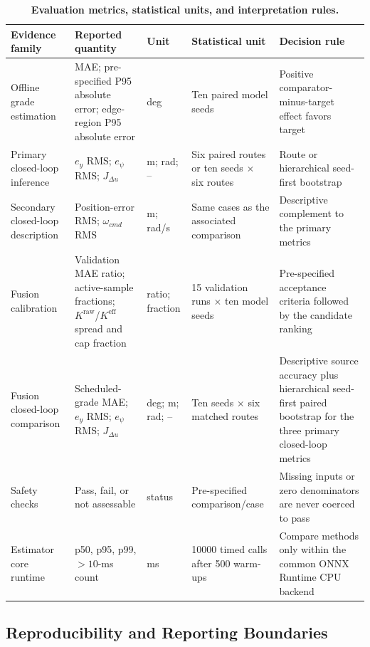 \documentclass{ieeeaccess}
\begin{document}
\begin{table}[!t]
\centering
\caption{\textbf{Evaluation metrics, statistical units, and interpretation rules.}}
\label{tab:evaluation_protocol}
\scriptsize
\setlength{\tabcolsep}{3.0pt}
\setlength{\tabcolsep}{3pt}
\begin{tabular}{|p{}|p{}|p{}|p{}|p{}|}
\hline
Evidence family & Reported quantity & Unit & Statistical unit & Decision rule \\
\hline
Offline grade estimation & MAE; pre-specified P95 absolute error; edge-region P95 absolute error & deg & Ten paired model seeds & Positive comparator-minus-target effect favors target \\
Primary closed-loop inference & $e_y$ RMS; $e_\psi$ RMS; $J_{\Delta u}$ & m; rad; -- & Six paired routes or ten seeds $\times$ six routes & Route or hierarchical seed-first bootstrap \\
Secondary closed-loop description & Position-error RMS; $\omega_{cmd}$ RMS & m; rad/s & Same cases as the associated comparison & Descriptive complement to the primary metrics \\
Fusion calibration & Validation MAE ratio; active-sample fractions; $K^{\mathrm{raw}}$/$K^{\mathrm{eff}}$ spread and cap fraction & ratio; fraction & 15 validation runs $\times$ ten model seeds & Pre-specified acceptance criteria followed by the candidate ranking \\
Fusion closed-loop comparison & Scheduled-grade MAE; $e_y$ RMS; $e_\psi$ RMS; $J_{\Delta u}$ & deg; m; rad; -- & Ten seeds $\times$ six matched routes & Descriptive source accuracy plus hierarchical seed-first paired bootstrap for the three primary closed-loop metrics \\
Safety checks & Pass, fail, or not assessable & status & Pre-specified comparison/case & Missing inputs or zero denominators are never coerced to pass \\
Estimator core runtime & p50, p95, p99, $>10$-ms count & ms & 10000 timed calls after 500 warm-ups & Compare methods only within the common ONNX Runtime CPU backend \\
\hline
\end{tabular}
\end{table}

\subsection{Reproducibility and Reporting Boundaries}
\end{document}
